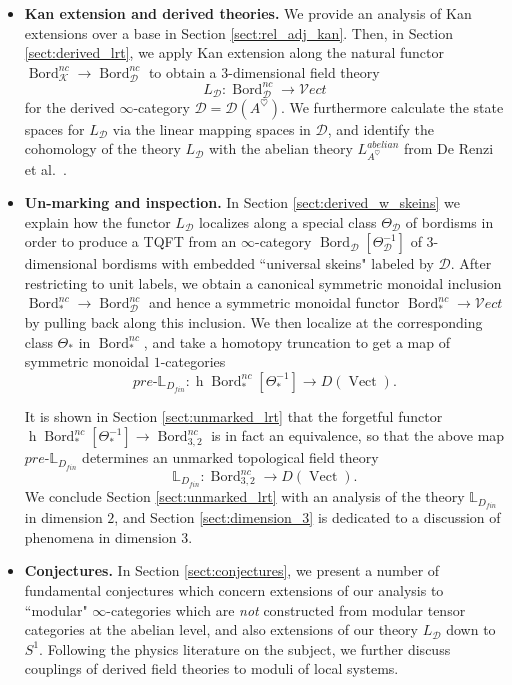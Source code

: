 \documentclass[reqno]{amsart}
\theoremstyle{definition}
\newcommand{\mbb}[1]{\mathbb{#1}}
\newcommand{\msc}[1]{\mathscr{#1}}
\newcommand{\opn}[1]{\operatorname{#1}}
\newcommand{\Vect}{\msc{V}\!ect}
\DeclareMathOperator{\Bord}{Bord}
\renewcommand{\1}{\mathbf{1}}
\begin{document}
\begin{itemize}
\item {\bf Kan extension and derived theories.} We provide an analysis of Kan extensions over a base in Section \ref{sect:rel_adj_kan}. Then, in Section \ref{sect:derived_lrt}, we apply Kan extension along the natural functor $\Bord^{nc}_{\msc{K}}\to \Bord^{nc}_{\msc{D}}$ to obtain a $3$-dimensional field theory
\[
L_{\msc{D}}:\Bord^{nc}_{\msc{D}}\to \Vect
\]
for the derived $\infty$-category $\msc{D}=\msc{D}(A^{\heartsuit})$. We furthermore calculate the state spaces for $L_{\msc{D}}$ via the linear mapping spaces in $\msc{D}$, and identify the cohomology of the theory $L_{\msc{D}}$ with the abelian theory $L^{abelian}_{A^{\heartsuit}}$ from De Renzi et al.\ \cite{derenzietal23}.
\vspace{2mm}

\item {\bf Un-marking and inspection.} In Section \ref{sect:derived_w_skeins} we explain how the functor $L_{\msc{D}}$ localizes along a special class $\Theta_{\msc{D}}$ of bordisms in order to produce a TQFT from an $\infty$-category $\Bord_{\msc{D}}[\Theta^{-1}_{\msc{D}}]$ of $3$-dimensional bordisms with embedded ``universal skeins" labeled by $\msc{D}$.  After restricting to unit labels, we obtain a canonical symmetric monoidal inclusion $\Bord_{\ast}^{nc}\to \Bord_{\msc{D}}^{nc}$ and hence a symmetric monoidal functor $\Bord^{nc}_{\ast}\to \Vect$ by pulling back along this inclusion.  We then localize at the corresponding class $\Theta_{\ast}$ in $\Bord^{nc}_{\ast}$, and take a homotopy truncation to get a map of symmetric monoidal $1$-categories
\[
pre\text{-}\mbb{L}_{D_{fin}}:\opn{h}\Bord_{\ast}^{nc}[\Theta^{-1}_{\ast}]\to D(\opn{Vect}).
\]
\par

It is shown in Section \ref{sect:unmarked_lrt} that the forgetful functor $\opn{h}\Bord_{\ast}^{nc}[\Theta^{-1}_{\ast}]\to \Bord_{3,2}^{nc}$ is in fact an equivalence, so that the above map $pre\text{-}\mbb{L}_{D_{fin}}$ determines an unmarked topological field theory
\[
\mbb{L}_{D_{fin}}:\Bord_{3,2}^{nc}\to D(\opn{Vect}).
\]
We conclude Section \ref{sect:unmarked_lrt} with an analysis of the theory $\mbb{L}_{D_{fin}}$ in dimension $2$, and Section \ref{sect:dimension_3} is dedicated to a discussion of phenomena in dimension $3$.
\vspace{2mm}

\item {\bf Conjectures.} In Section \ref{sect:conjectures}, we present a number of fundamental conjectures which concern extensions of our analysis to ``modular" $\infty$-categories which are \emph{not} constructed from modular tensor categories at the abelian level, and also extensions of our theory $L_{\msc{D}}$ down to $S^1$. Following the physics literature on the subject, we further discuss couplings of derived field theories to moduli of local systems.
\vspace{2mm}


\end{itemize}
\end{document}
